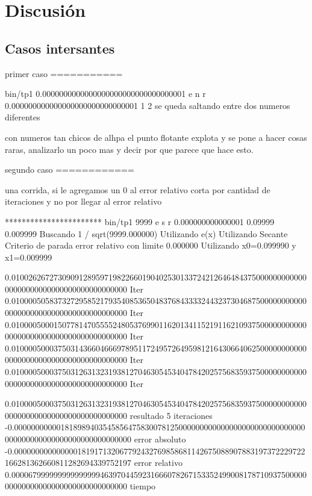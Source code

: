 \section{Discusión}

\subsection{Casos intersantes}

primer caso
===========

bin/tp1 0.0000000000000000000000000000000001 e n r 0.000000000000000000000000000001 1 2
se queda saltando entre dos numeros diferentes

con numeros tan chicos de alhpa el punto flotante explota y se pone a hacer cosas raras, analizarlo un poco mas y decir por que parece que hace esto.


segundo caso
============

una corrida, si le agregamos un 0 al error relativo corta por cantidad de iteraciones y no por llegar al error relativo

*********************** bin/tp1 9999 e s r 0.000000000000001 0.09999 0.009999
Buscando 1 / sqrt(9999.000000)
Utilizando e(x)
Utilizando Secante
Criterio de parada error relativo con limite 0.000000
Utilizando x0=0.099990 y x1=0.009999

0.010026267273090912895971982266019040253013372421264648437500000000000000000000000000000000000000000 Iter
0.010000505837327295852179354085365048376843333244323730468750000000000000000000000000000000000000000 Iter
0.010000500015077814705555248053769901162013411521911621093750000000000000000000000000000000000000000 Iter
0.010000500037503143660466697895117249572649598121643066406250000000000000000000000000000000000000000 Iter
0.010000500037503126313231938127046305453404784202575683593750000000000000000000000000000000000000000 Iter

0.010000500037503126313231938127046305453404784202575683593750000000000000000000000000000000000000000 resultado
5 iteraciones
-0.000000000001818989403545856475830078125000000000000000000000000000000000000000000000000000000000000 error absoluto
-0.000000000000000181917132067792432769858681142675088907883197372229722166281362660811282694339752197 error relativo
0.000067999999999999999463970445923166607826715335249900817871093750000000000000000000000000000000000 tiempo


